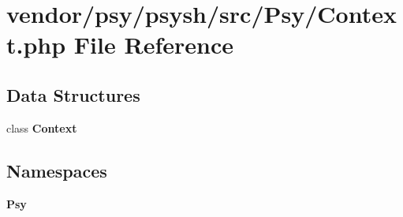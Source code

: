 \section{vendor/psy/psysh/src/\+Psy/\+Context.php File Reference}
\label{psy_2psysh_2src_2_psy_2_context_8php}
\subsection*{Data Structures}
\begin{DoxyCompactItemize}
\item 
class {\bf Context}
\end{DoxyCompactItemize}
\subsection*{Namespaces}
\begin{DoxyCompactItemize}
\item 
 {\bf Psy}
\end{DoxyCompactItemize}
